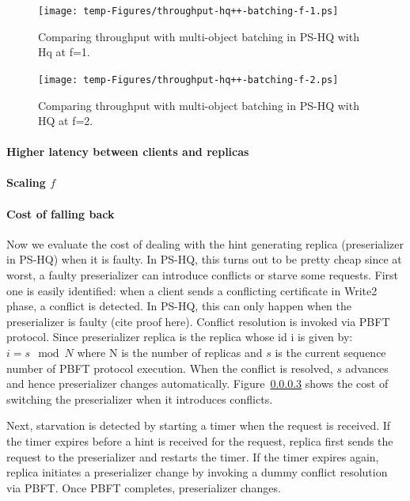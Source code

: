 \documentclass[twocolumn,10pt]{article}
\begin{document}
\begin{figure}
\centering
\texttt{[image: temp-Figures/throughput-hq++-batching-f-1.ps]}
\caption{Comparing throughput with multi-object batching in PS-HQ with Hq at f=1.}
\label{fig:throughtput-pshq-batching-f-1}
\end{figure}

\begin{figure}
\centering
\texttt{[image: temp-Figures/throughput-hq++-batching-f-2.ps]}
\caption{Comparing throughput with multi-object batching in PS-HQ with HQ at f=2.}
\label{fig:throughtput-pshq-batching-f-2}
\end{figure}

\paragraph{Higher latency between clients and replicas}

\paragraph{Scaling $f$}

\paragraph{Cost of falling back} Now we evaluate the cost of dealing with the hint generating replica
(preserializer in PS-HQ) when it is faulty. In PS-HQ, this turns out to be pretty cheap since at worst, 
a faulty preserializer can introduce conflicts or starve some requests. First one is easily identified:
when a client sends a conflicting certificate in Write2 phase, a conflict is detected. In PS-HQ, this
can only happen when the preserializer is faulty (cite proof here). Conflict resolution is invoked
via PBFT protocol. Since preserializer replica is the replica whose id i is given by: $i = s \mod N$ 
where N is the number of replicas and $s$ is the current sequence number of PBFT protocol execution.
When the conflict is resolved, $s$ advances and hence preserializer changes automatically. Figure~\ref{}
shows the cost of switching the preserializer when it introduces conflicts.

Next, starvation is detected by starting a timer when the request is received. If the timer expires 
before a hint is received for the request, replica first sends the request to the preserializer and
restarts the timer. If the timer expires again, replica initiates a preserializer change by invoking
a dummy conflict resolution via PBFT. Once PBFT completes, preserializer changes.
\end{document}
